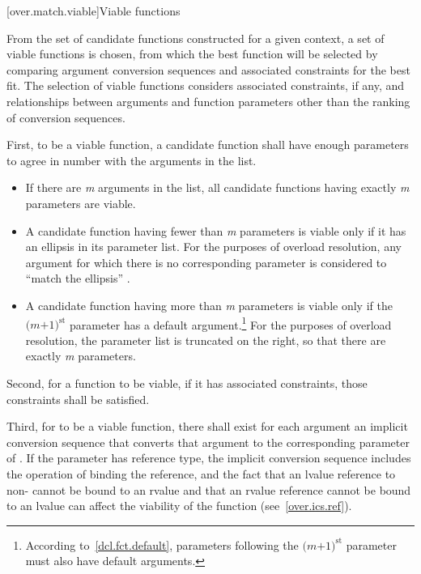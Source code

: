 %

[over.match.viable]{Viable functions}%

\pnum
From the set of candidate functions constructed for a given
context, a set of viable functions is
chosen, from which the best function will be selected by
comparing argument conversion sequences
and associated constraints
for the best fit.
The selection of viable functions considers
associated constraints, if any, and
relationships between arguments and function parameters other
than the ranking of conversion sequences.

\pnum
{}%
%
First, to be a viable function, a candidate function shall have
enough parameters to agree in number with the arguments in the
list.

\begin{itemize}
\item
If there are
\textit{m}
arguments in the list, all candidate
functions having exactly
\textit{m}
parameters are viable.
\item
A candidate function having fewer than
\textit{m}
parameters is
viable only if it has an ellipsis in its parameter list.
For the purposes of overload resolution,
any argument for which there is no corresponding parameter is
considered to ``match the ellipsis'' .
\item
A candidate function having more than
\textit{m}
parameters is viable
only if the
$\textit{(m+1)}^\text{st}$
parameter has a default
argument.\footnote{According to~\ref{dcl.fct.default},
parameters following the
$\textit{(m+1)}^\text{st}$
parameter must also have default arguments.}
For the purposes of overload
resolution, the parameter list is truncated on the right, so
that there are exactly
\textit{m}
parameters.
\end{itemize}

\pnum
Second, for a function to be viable, if it has associated constraints,
those constraints shall be satisfied.

\pnum
Third, for
to be a viable function, there shall exist for each
argument an
implicit conversion sequence that
converts that argument to the corresponding parameter of
.
If the parameter has reference type, the implicit conversion sequence
includes the operation of binding the reference, and the fact that
an lvalue reference to non- cannot be bound to an rvalue
and that an rvalue reference cannot be bound to an lvalue
can affect
the viability of the function (see~\ref{over.ics.ref}).

